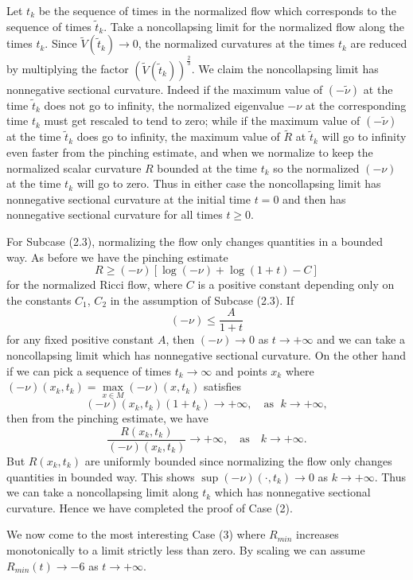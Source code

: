 Let $t_k$ be the sequence of times in the normalized flow which
corresponds to the sequence of times $\tilde{t}_k$. Take a
noncollapsing limit for the normalized flow along the times $t_k$.
Since $\tilde{V}(\tilde{t}_k)\rightarrow 0$, the normalized
curvatures at the times $t_k$ are reduced by multiplying the
factor $(\tilde{V}(\tilde{t}_k))^\frac{2}{3}$. We claim the
noncollapsing limit has nonnegative sectional curvature. Indeed if
the maximum value of $(-\tilde{\nu})$ at the time $\tilde{t}_k$
does not go to infinity, the normalized eigenvalue $-\nu$ at the
corresponding time $t_k$ must get rescaled to tend to zero; while
if the maximum value of $(-\tilde{\nu})$ at the time $\tilde{t}_k$
does go to infinity, the maximum value of $\tilde{R}$ at
$\tilde{t}_k$ will go to infinity even faster from the pinching
estimate, and when we normalize to keep the normalized scalar
curvature $R$ bounded at the time $t_k$ so the normalized
$(-{\nu})$ at the time $t_k$ will go to zero. Thus in either case
the noncollapsing limit has nonnegative sectional curvature at the
initial time $t=0$ and then has nonnegative sectional curvature
for all times $t\ge 0$.

For Subcase (2.3), normalizing the flow only changes quantities in
a bounded way. As before we have the pinching estimate
$$R\ge (-\nu)[\log(-\nu)+\log(1+t)-C]$$
for the normalized Ricci flow, where $C$ is a positive constant
depending only on the constants $C_1$, $C_2$ in the assumption of
Subcase (2.3). If $$(-\nu)\le \frac{A}{1+t}$$ for any fixed
positive constant $A$, then $(-\nu)\rightarrow 0$ as $t\rightarrow
+\infty$ and we can take a noncollapsing limit which has
nonnegative sectional curvature. On the other hand if we can pick
a sequence of times $t_k\rightarrow\infty$ and points $x_k$ where
$(-\nu)(x_k,t_k)=\max\limits_{x\in M}(-\nu)(x,t_k)$ satisfies
$$
(-\nu)(x_k,t_k)(1+t_k)\rightarrow +\infty,\quad \text{as } \;
k\rightarrow +\infty,
$$
then from the pinching estimate, we have
$$
\frac{R(x_k,t_k)}{(-\nu)(x_k,t_k)}\rightarrow +\infty,\quad
\text{as}\quad k\rightarrow +\infty.
$$
But $R(x_k,t_k)$ are uniformly bounded since normalizing the flow
only changes quantities in bounded way. This shows $\sup
(-\nu)(\cdot,t_k)\rightarrow 0$ as $k\rightarrow+\infty$. Thus we
can take a noncollapsing limit along $t_k$ which has nonnegative
sectional curvature. Hence we have completed the proof of Case
(2).

We now come to the most interesting Case (3) where $R_{min}$
increases monotonically to a limit strictly less than zero. By
scaling we can assume $R_{min}(t)\rightarrow -6$ as $t\rightarrow
+\infty$.

